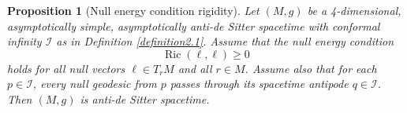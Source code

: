 \documentclass[12pt]{amsart}
\numberwithin{equation}{section}
\newtheorem{proposition}[theorem]{Proposition}
\DeclareMathOperator{\ric}{Ric}
\begin{document}
\begin{proposition}[Null energy condition rigidity]\label{proposition3.1}
Let $(M,g)$ be a 4-dimensional, asymptotically simple, asymptotically anti-de Sitter spacetime with conformal infinity ${\mathcal I}$ as in Definition \ref{definition2.1}. Assume that the null energy condition
\begin{equation}
\label{eq3.1}\ric(\ell,\ell)\ge 0
\end{equation}
holds for all null vectors $\ell\in T_rM$ and all $r\in M$. Assume also that for each $p\in {\mathcal I}$, every null geodesic from $p$ passes through its spacetime antipode $q\in {\mathcal I}$. Then $(M,g)$ is anti-de Sitter spacetime.
\end{proposition}
\end{document}
